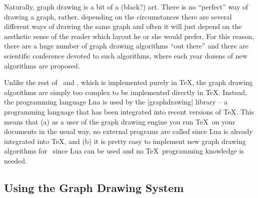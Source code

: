 Naturally, graph drawing is a bit of a (black?) art. There is no ``perfect''
way of drawing a graph, rather, depending on the circumstances there are
several different ways of drawing the same graph and often it will just depend
on the aesthetic sense of the reader which layout he or she would prefer. For
this reason, there are a huge number of graph drawing algorithms ``out there''
and there are scientific conference devoted to such algorithms, where each year
dozens of new algorithms are proposed.

Unlike the rest of \pgfname\ and \tikzname, which is implemented purely in
\TeX, the graph drawing algorithms are simply too complex to be implemented
directly in \TeX. Instead, the programming language Lua is used by the
|graphdrawing| library -- a programming language that has been integrated into
recent versions of \TeX. This means that (a) as a user of the graph drawing
engine you run \TeX\ on your documents in the usual way, no external programs
are called since Lua is already integrated into \TeX, and (b) it is pretty easy
to implement new graph drawing algorithms for \tikzname\ since Lua can be used
and no \TeX\ programming knowledge is needed.


\subsection{Using the Graph Drawing System}


